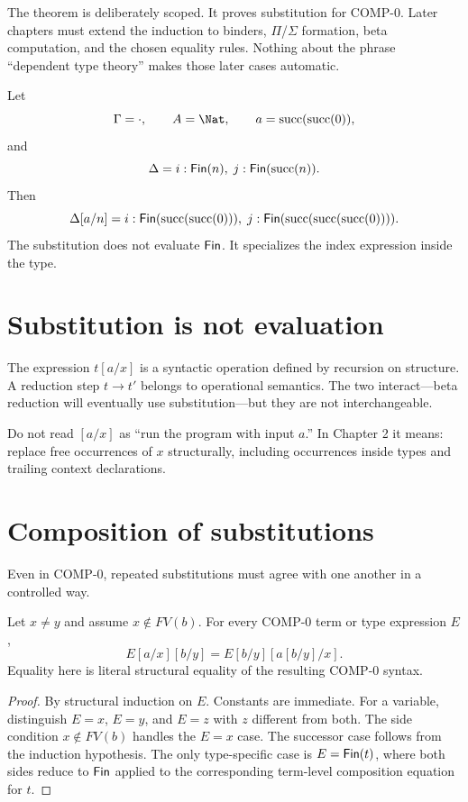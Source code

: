 \documentclass[11pt,openany]{book}
\begin{document}
The theorem is deliberately scoped. It proves substitution for COMP-0. Later chapters must extend the induction to binders, $\Pi$/$\Sigma$ formation, beta computation, and the chosen equality rules. Nothing about the phrase ``dependent type theory'' makes those later cases automatic.

\begin{workedexample}
Let
\[
  \Gamma = \cdot,
  \qquad A=\Nat,
  \qquad a=\mathrm{succ}(\mathrm{succ}(0)),
\]
and
\[
  \Delta = i:\mathsf{Fin}(n),\; j:\mathsf{Fin}(\mathrm{succ}(n)).
\]
Then
\[
  \Delta[a/n]
  = i:\mathsf{Fin}(\mathrm{succ}(\mathrm{succ}(0))),\;
    j:\mathsf{Fin}(\mathrm{succ}(\mathrm{succ}(\mathrm{succ}(0)))).
\]
The substitution does not evaluate $\mathsf{Fin}$. It specializes the index expression inside the type.
\end{workedexample}

\section{Substitution is not evaluation}

The expression $t[a/x]$ is a syntactic operation defined by recursion on structure. A reduction step $t\to t'$ belongs to operational semantics. The two interact---beta reduction will eventually use substitution---but they are not interchangeable.

\begin{warningbox}
Do not read $[a/x]$ as ``run the program with input $a$.'' In Chapter 2 it means: replace free occurrences of $x$ structurally, including occurrences inside types and trailing context declarations.
\end{warningbox}

\section{Composition of substitutions}

Even in COMP-0, repeated substitutions must agree with one another in a controlled way.

\begin{lemma}
Let $x\neq y$ and assume $x\notin FV(b)$. For every COMP-0 term or type expression $E$,
\[
  E[a/x][b/y]
  =
  E[b/y][a[b/y]/x].
\]
Equality here is literal structural equality of the resulting COMP-0 syntax.
\end{lemma}

\begin{proof}
By structural induction on $E$. Constants are immediate. For a variable, distinguish $E=x$, $E=y$, and $E=z$ with $z$ different from both. The side condition $x\notin FV(b)$ handles the $E=x$ case. The successor case follows from the induction hypothesis. The only type-specific case is $E=\mathsf{Fin}(t)$, where both sides reduce to $\mathsf{Fin}$ applied to the corresponding term-level composition equation for $t$.
\end{proof}
\end{document}
